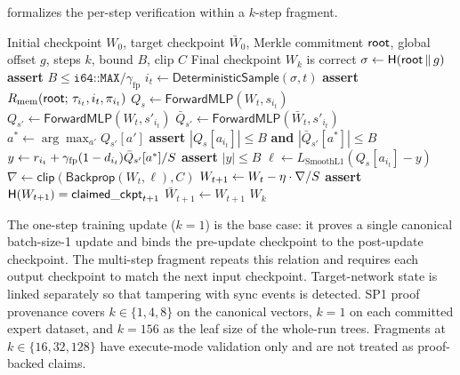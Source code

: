  formalizes the per-step verification within a
$k$-step fragment.

\begin{algorithm}[!t]
\caption{$k$-Step Training Fragment Verification}
\label{alg:training-fragment}
\begin{algorithmic}[1]
\Require Initial checkpoint $W_0$, target checkpoint $\bar{W}_0$,
  Merkle commitment $\mathsf{root}$, global offset $g$, steps $k$,
  bound $B$, clip $C$
\Ensure Final checkpoint $W_k$ is correct
\State $\sigma \gets \mathsf{H}(\mathsf{root} \,\|\, g)$
\State \textbf{assert} $B \le \texttt{i64::MAX} / \gamma_{\mathrm{fp}}$
  \State $i_t \gets \mathsf{DeterministicSample}(\sigma, t)$
  \State \textbf{assert} $R_{\mathrm{mem}}(\mathsf{root};\, \tau_{i_t},
    i_t, \pi_{i_t})$
  \State $Q_s \gets \mathsf{ForwardMLP}(W_t, s_{i_t})$
  \State $Q_{s'} \gets \mathsf{ForwardMLP}(W_t, s'_{i_t})$
  \State $\bar{Q}_{s'} \gets \mathsf{ForwardMLP}(\bar{W}_t, s'_{i_t})$
  \State $a^* \gets \arg\max_{a'} Q_{s'}[a']$
  \State \textbf{assert} $|Q_s[a_{i_t}]| \le B$ \textbf{and}
    $|\bar{Q}_{s'}[a^*]| \le B$
  \State $y \gets r_{i_t} + \gamma_{\mathrm{fp}}(1 - d_{i_t}) \bar{Q}_{s'}[a^*]
    / S$
  \State \textbf{assert} $|y| \le B$
  \State $\ell \gets L_{\mathrm{SmoothL1}}(Q_s[a_{i_t}] - y)$
  \State $\nabla \gets \mathsf{clip}(\mathsf{Backprop}(W_t, \ell), C)$
  \State $W_{t+1} \gets W_t - \eta \cdot \nabla / S$
  \State \textbf{assert} $\mathsf{H}(W_{t+1}) = \mathsf{claimed\_ckpt}_{t+1}$
    \State $\bar{W}_{t+1} \gets W_{t+1}$
  \EndIf
\EndFor
\State \Return $W_k$
\end{algorithmic}
\end{algorithm}

The one-step training update ($k=1$) is the base case: it proves a single
canonical batch-size-1 update and binds the pre-update checkpoint to the
post-update checkpoint. The multi-step fragment repeats this relation and
requires each output checkpoint to match the next input checkpoint.
Target-network state is linked separately so that tampering with sync events is
detected. SP1 proof provenance covers $k \in \{1, 4, 8\}$ on the canonical
vectors, $k = 1$ on each committed expert dataset, and $k = 156$ as the leaf
size of the whole-run trees. Fragments at $k \in \{16, 32, 128\}$ have
execute-mode validation only and are not treated as proof-backed claims.

